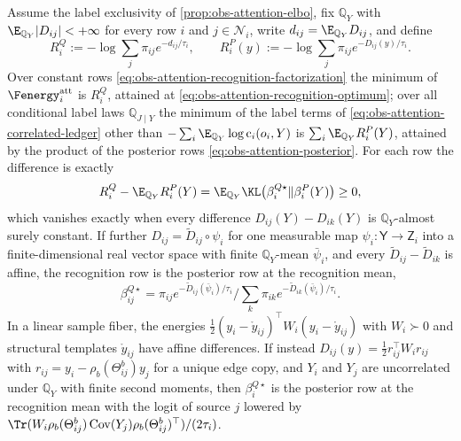 Assume the label exclusivity of \cref{prop:obs-attention-elbo}, fix
\(\mathbb Q_Y\) with \(\E_{\mathbb Q_Y}\lvert D_{ij}\rvert<+\infty\) for every
row \(i\) and \(j\in\mathcal N_i\), write \(d_{ij}=\E_{\mathbb Q_Y}D_{ij}\), and
define
\begin{equation}
R_i^Q:=-\log\sum_j\pi_{ij}e^{-d_{ij}/\tau_i},
\qquad
R_i^P(y):=-\log\sum_j\pi_{ij}e^{-D_{ij}(y)/\tau_i}.
\label{eq:obs-attention-row-potentials}
\end{equation}
Over constant rows \eqref{eq:obs-attention-recognition-factorization} the
minimum of \(\Fenergy_i^{\rm att}\) is \(R_i^Q\), attained at
\eqref{eq:obs-attention-recognition-optimum}; over all conditional label laws
\(\mathbb Q_{J\mid Y}\) the minimum of the label terms of
\eqref{eq:obs-attention-correlated-ledger} other than
\(-\sum_i\E_{\mathbb Q_Y}\log\mathrm c_i(o_i,Y)\) is
\(\sum_i\E_{\mathbb Q_Y}R_i^P(Y)\), attained by the product of the posterior
rows \eqref{eq:obs-attention-posterior}. For each row the difference is exactly
\begin{equation}
R_i^Q-\E_{\mathbb Q_Y}R_i^P(Y)
=\E_{\mathbb Q_Y}\KL\bigl(\beta_i^{Q\star}\Vert\beta_i^P(Y)\bigr)\geq0,
\label{eq:obs-attention-jensen-gap}
\end{equation}
which vanishes exactly when every difference \(D_{ij}(Y)-D_{ik}(Y)\) is
\(\mathbb Q_Y\)-almost surely constant. If further
\(D_{ij}=\widetilde D_{ij}\circ\psi_i\) for one measurable map
\(\psi_i:\mathsf Y\to\mathsf Z_i\) into a finite-dimensional real vector space
with finite \(\mathbb Q_Y\)-mean \(\bar\psi_i\), and every
\(\widetilde D_{ij}-\widetilde D_{ik}\) is affine, the recognition row is the
posterior row at the recognition mean,
\begin{equation}
\beta^{Q\star}_{ij}
=\pi_{ij}e^{-\widetilde D_{ij}(\bar\psi_i)/\tau_i}\Big/\sum_k\pi_{ik}e^{-\widetilde D_{ik}(\bar\psi_i)/\tau_i}.
\label{eq:obs-attention-affine-row}
\end{equation}
In a linear sample fiber, the energies
\(\frac12(y_i-\mathring y_{ij})^\top W_i(y_i-\mathring y_{ij})\) with
\(W_i\succ0\) and structural templates \(\mathring y_{ij}\) have affine
differences. If instead \(D_{ij}(y)=\frac12 r_{ij}^\top W_ir_{ij}\) with
\(r_{ij}=y_i-\rho_b(\Theta^b_{ij})y_j\) for a unique edge copy, and \(Y_i\) and
\(Y_j\) are uncorrelated under \(\mathbb Q_Y\) with finite second moments, then
\(\beta_i^{Q\star}\) is the posterior row at the recognition mean with the
logit of source \(j\) lowered by
\(\Tr(W_i\rho_b(\Theta^b_{ij})\operatorname{Cov}(Y_j)
\rho_b(\Theta^b_{ij})^\top)/(2\tau_i)\).

